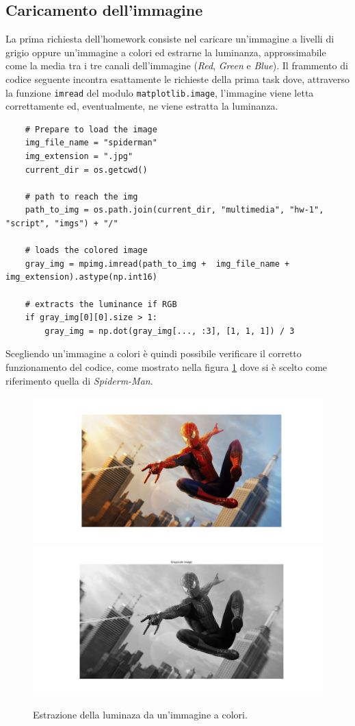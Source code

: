 \vspace{15px}\subsection{Caricamento dell'immagine}
La prima richiesta dell'homework consiste nel caricare un'immagine a livelli di grigio oppure un'immagine a colori ed estrarne la luminanza, approssimabile come la media tra i tre canali dell'immagine (\textsl{Red}, \textsl{Green} e \textsl{Blue}). Il frammento di codice seguente incontra esattamente le richieste della prima task dove, attraverso la funzione \texttt{imread} del modulo \texttt{matplotlib.image}, l'immagine viene letta correttamente ed, eventualmente, ne viene estratta la luminanza.

\begin{lstlisting}
    # Prepare to load the image
    img_file_name = "spiderman"
    img_extension = ".jpg"
    current_dir = os.getcwd()

    # path to reach the img
    path_to_img = os.path.join(current_dir, "multimedia", "hw-1", "script", "imgs") + "/"

    # loads the colored image
    gray_img = mpimg.imread(path_to_img +  img_file_name + img_extension).astype(np.int16)

    # extracts the luminance if RGB
    if gray_img[0][0].size > 1:
        gray_img = np.dot(gray_img[..., :3], [1, 1, 1]) / 3
\end{lstlisting}

\noindent Scegliendo un'immagine a colori è quindi possibile verificare il corretto funzionamento del codice, come mostrato nella figura \ref{fig:colored-grayscale} dove si è scelto come riferimento quella di \textsl{Spiderm-Man}.

\begin{figure}[h]
    \centering
    \includegraphics[width = .7\textwidth]{hw-1/report/imgs/colored.png}
    \includegraphics[width = .7\textwidth]{hw-1/report/imgs/grayscale.png}
    \caption{Estrazione della luminaza da un'immagine a colori.}
    \label{fig:colored-grayscale}
\end{figure}



